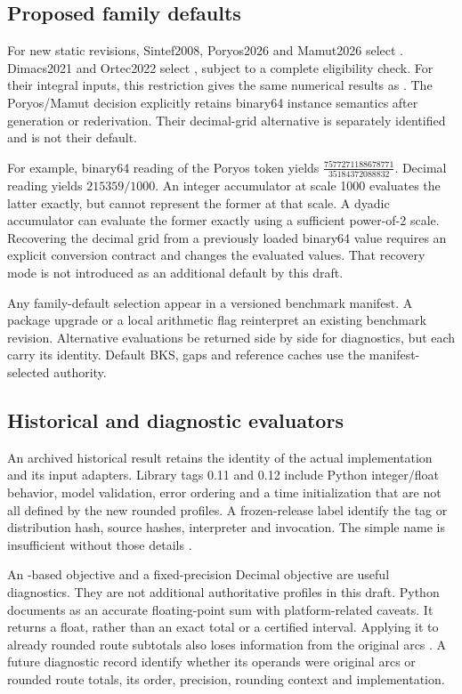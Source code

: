 \subsection{Proposed family defaults}
For new static revisions, Sintef2008, Poryos2026 and Mamut2026 select . Dimacs2021 and Ortec2022 select , subject to a complete eligibility check. For their integral inputs, this restriction gives the same numerical results as . The Poryos/Mamut decision explicitly retains binary64 instance semantics after generation or rederivation. Their decimal-grid alternative is separately identified and is not their default.

For example, binary64 reading of the Poryos token  yields $\frac{7577271188678771}{35184372088832}$. Decimal reading yields $215359/1000$. An integer accumulator at scale 1000 evaluates the latter exactly, but cannot represent the former at that scale. A dyadic accumulator can evaluate the former exactly using a sufficient power-of-2 scale. Recovering the decimal grid from a previously loaded binary64 value requires an explicit conversion contract and changes the evaluated values. That recovery mode is not introduced as an additional default by this draft.

Any family-default selection \must{} appear in a versioned benchmark manifest. A package upgrade or a local arithmetic flag \mustnot{} reinterpret an existing benchmark revision. Alternative evaluations \may{} be returned side by side for diagnostics, but each \must{} carry its identity. Default BKS, gaps and reference caches \must{} use the manifest-selected authority.

\subsection{Historical and diagnostic evaluators}
An archived historical result retains the identity of the actual implementation and its input adapters. Library tags 0.11 and 0.12 include Python integer/float behavior, model validation, error ordering and a time initialization that are not all defined by the new rounded profiles. A frozen-release label \must{} identify the tag or distribution hash, source hashes, interpreter and invocation. The simple name  is insufficient without those details \autocite{rascoussierNumericalContracts2026}.

An -based objective and a fixed-precision Decimal objective are useful diagnostics. They are not additional authoritative profiles in this draft. Python documents  as an accurate floating-point sum with platform-related caveats. It returns a float, rather than an exact total or a certified interval. Applying it to already rounded route subtotals also loses information from the original arcs \autocite{pythonMath2026}. A future diagnostic record \must{} identify whether its operands were original arcs or rounded route totals, its order, precision, rounding context and implementation.

